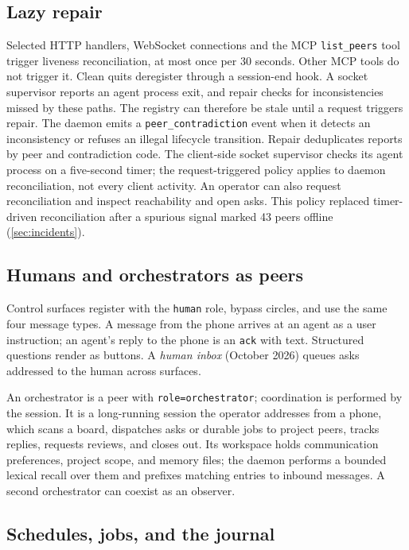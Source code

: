 \documentclass[10pt,twocolumn]{article}
\newcommand{\code}[1]{\texttt{#1}}
\begin{document}
\subsection{Lazy repair}
\label{sec:lazy}

Selected HTTP handlers, WebSocket connections and the MCP \code{list\_peers} tool trigger liveness reconciliation, at most once per 30 seconds. Other MCP tools do not trigger it. Clean quits deregister through a session-end hook. A socket supervisor reports an agent process exit, and repair checks for inconsistencies missed by these paths. The registry can therefore be stale until a request triggers repair. The daemon emits a \code{peer\_contradiction} event when it detects an inconsistency or refuses an illegal lifecycle transition. Repair deduplicates reports by peer and contradiction code. The client-side socket supervisor checks its agent process on a five-second timer; the request-triggered policy applies to daemon reconciliation, not every client activity. An operator can also request reconciliation and inspect reachability and open asks. This policy replaced timer-driven reconciliation after a spurious signal marked 43 peers offline (\cref{sec:incidents}).

\subsection{Humans and orchestrators as peers}
\label{sec:humans}

Control surfaces register with the \code{human} role, bypass circles, and use the same four message types. A message from the phone arrives at an agent as a user instruction; an agent's reply to the phone is an \code{ack} with text. Structured questions render as buttons. A \emph{human inbox} (October 2026) queues asks addressed to the human across surfaces.

An orchestrator is a peer with \code{role=orchestrator}; coordination is performed by the session. It is a long-running session the operator addresses from a phone, which scans a board, dispatches asks or durable jobs to project peers, tracks replies, requests reviews, and closes out. Its workspace holds communication preferences, project scope, and memory files; the daemon performs a bounded lexical recall over them and prefixes matching entries to inbound messages. A second orchestrator can coexist as an observer.

\subsection{Schedules, jobs, and the journal}
\end{document}
